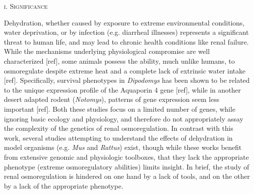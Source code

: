 \documentclass[11pt]{article}
\begin{document}
\setlength{\parindent}{1cm}
\setcounter{page}{0}

\pagestyle{fancy}



%
%

\setcounter{page}{1}
\normalsize 
\begin{center}
\textsc{{i. Significance}} \\
\end{center}

Dehydration, whether caused by exposure to extreme environmental conditions, water deprivation, or by infection (e.g. diarrheal illnesses) represents a significant threat to human life, and may lead to chronic health conditions like renal failure. While the mechanisms underlying physiological compromise are well characterized [ref], some animals possess the ability, much unlike humans, to osmoregulate despite extreme heat and a complete lack of extrinsic water intake [ref]. Specifically, survival phenotypes in \textit{Dipodomys} has been shown to be related to the unique expression profile of the Aquaporin 4 gene [ref], while in another desert adapted rodent (\textit{Notomys}), patterns of gene expression seem less important [ref]. Both these studies focus on a limited number of genes, while ignoring basic ecology and physiology, and therefore do not appropriately assay the complexity of the genetics of renal osmoregulation. In contrast with this work, several studies attempting to understand the effects of dehydration in model organisms (e.g. \textit{Mus} and \textit{Rattus}) exist, though while these works benefit from extensive genomic and physiologic toolboxes, that they lack the appropriate phenotype (extreme osmoregulatory abilities) limits insight. In brief, the study of renal osmoregulation is hindered on one hand by a lack of tools, and on the other by a lack of the appropriate phenotype. \\
\end{document}
